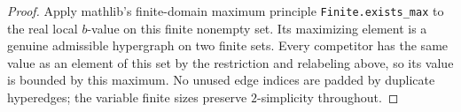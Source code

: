 \begin{proof}
Apply mathlib's finite-domain maximum principle \texttt{Finite.exists\_max} to the real local
$b$-value on this finite nonempty set. Its maximizing element is a genuine
admissible hypergraph on two finite sets. Every competitor has the same
value as an element of this set by the restriction and relabeling above,
so its value is bounded by this maximum. No unused edge indices are padded
by duplicate hyperedges; the variable finite sizes preserve $2$-simplicity
throughout.
\end{proof}
